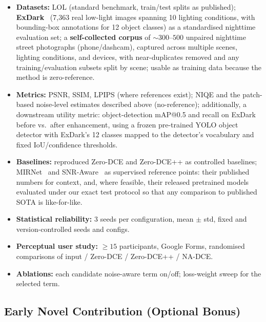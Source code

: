 \documentclass[11pt, letterpaper]{article}
\begin{document}
\begin{itemize}[noitemsep]
  \item \textbf{Datasets:} LOL (standard benchmark, train/test splits as published); \textbf{ExDark}~\cite{loh2019getting} (7{,}363 real low-light images spanning 10 lighting conditions, with bounding-box annotations for 12 object classes) as a standardised nighttime evaluation set; a \textbf{self-collected corpus} of ${\sim}300$--$500$ unpaired nighttime street photographs (phone/dashcam), captured across multiple scenes, lighting conditions, and devices, with near-duplicates removed and any training/evaluation subsets split by scene; usable as training data because the method is zero-reference.
  \item \textbf{Metrics:} PSNR, SSIM, LPIPS (where references exist); NIQE and the patch-based noise-level estimates described above (no-reference); additionally, a downstream utility metric: object-detection mAP@0.5 and recall on ExDark before vs.\ after enhancement, using a frozen pre-trained YOLO object detector with ExDark's 12 classes mapped to the detector's vocabulary and fixed IoU/confidence thresholds.
  \item \textbf{Baselines:} reproduced Zero-DCE and Zero-DCE++ as controlled baselines; MIRNet~\cite{zamir2020learning} and SNR-Aware~\cite{xu2022snr} as supervised reference points: their published numbers for context, and, where feasible, their released pretrained models evaluated under our exact test protocol so that any comparison to published SOTA is like-for-like.
  \item \textbf{Statistical reliability:} 3 seeds per configuration, mean $\pm$ std, fixed and version-controlled seeds and configs.
  \item \textbf{Perceptual user study:} $\geq 15$ participants, Google Forms, randomised comparisons of input / Zero-DCE / Zero-DCE++ / NA-DCE.
  \item \textbf{Ablations:} each candidate noise-aware term on/off; loss-weight sweep for the selected term.
\end{itemize}

\subsection{Early Novel Contribution (Optional Bonus)}
\end{document}
